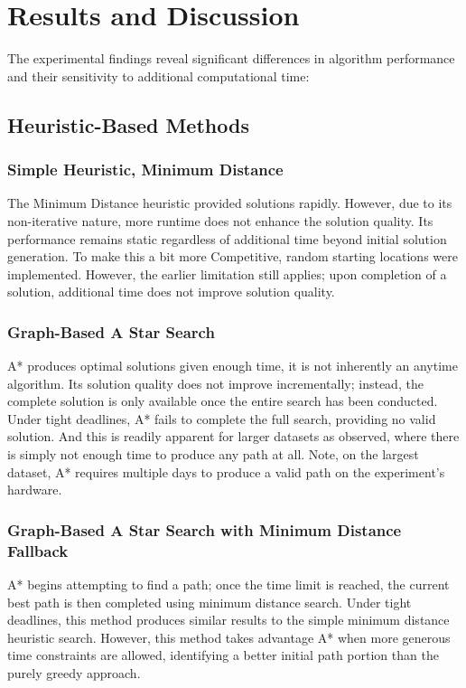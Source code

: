 \documentclass[11pt]{article}
\begin{document}
	\section{Results and Discussion}
	The experimental findings reveal significant differences in algorithm performance and their sensitivity to additional computational time:
	
	\subsection{Heuristic-Based Methods}	
	\subsubsection{Simple Heuristic, Minimum Distance}
	The Minimum Distance heuristic provided solutions rapidly. However, due to its non-iterative nature, more runtime does not enhance the solution quality. Its performance remains static regardless of additional time beyond initial solution generation. To make this a bit more Competitive, random starting locations were implemented. However, the earlier limitation still applies; upon completion of a solution, additional time does not improve solution quality.
	
	\subsubsection{Graph-Based A Star Search}
	A* produces optimal solutions given enough time, it is not inherently an anytime algorithm. Its solution quality does not improve incrementally; instead, the complete solution is only available once the entire search has been conducted. Under tight deadlines, A* fails to complete the full search, providing no valid solution. And this is readily apparent for larger datasets as observed, where there is simply not enough time to produce any path at all. Note, on the largest dataset, A* requires multiple days to produce a valid path on the experiment's hardware.
	
	\subsubsection{Graph-Based A Star Search with Minimum Distance Fallback}
	A* begins attempting to find a path; once the time limit is reached, the current best path is then completed using minimum distance search. Under tight deadlines, this method produces similar results to the simple minimum distance heuristic search. However, this method takes advantage A* when more generous time constraints are allowed, identifying a better initial path portion than the purely greedy approach.
	
\end{document}
